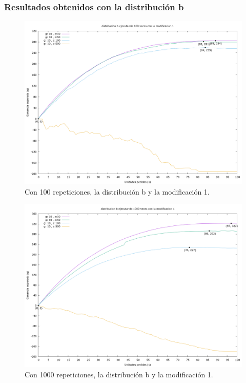 \documentclass[12pt, spanish]{article}
\begin{document}
\subsubsection{Resultados obtenidos con la distribución b}



\begin{figure}[H]
	\centering
	\includegraphics[scale = 0.3]{prob_b/datos_b_100_1.png}
	\caption{Con 100 repeticiones, la distribución b y la modificación 1.}
	\label{fig:ej1_a_100}

\end{figure}

\begin{figure}[H]
	\centering
	\includegraphics[scale = 0.3]{prob_b/datos_b_1000_1.png}
	\caption{Con 1000 repeticiones, la distribución b y la modificación 1.}
	\label{fig:ej1_a_1000}

\end{figure}
\end{document}
